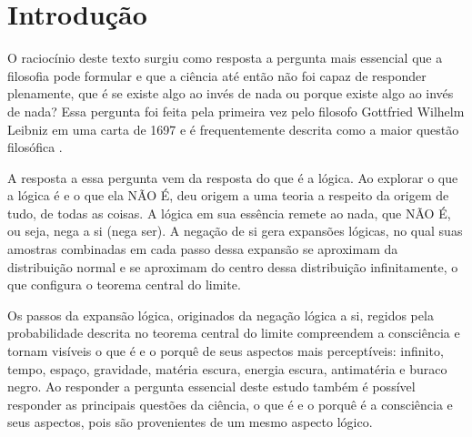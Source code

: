 \section*{Introdução}

O raciocínio deste texto surgiu como resposta a pergunta mais essencial que a filosofia pode formular e que a ciência até então não foi capaz de responder plenamente, que é se existe algo ao invés de nada ou porque existe algo ao invés de nada? 
Essa pergunta foi feita pela primeira vez pelo filosofo Gottfried Wilhelm Leibniz em uma carta de 1697 e é frequentemente descrita como a maior questão filosófica \cite{ leibnizbrasil_origem_das_coisas}.

A resposta a essa pergunta vem da resposta do que é a lógica. Ao explorar o que a lógica é e o que ela NÃO É, deu origem a uma teoria a respeito da origem de tudo, de todas as coisas. A lógica em sua essência remete ao nada, que NÃO É, ou seja, nega a si (nega ser). A negação de si gera expansões lógicas, no qual suas amostras combinadas em cada passo dessa expansão se aproximam da distribuição normal e se aproximam do centro dessa distribuição infinitamente, o que configura o teorema central do limite. 

Os passos da expansão lógica, originados da negação lógica a si, regidos pela probabilidade descrita no teorema central do limite compreendem a consciência e tornam visíveis o que é e o porquê de seus aspectos mais perceptíveis: infinito, tempo, espaço, gravidade, matéria escura, energia escura, antimatéria e buraco negro. Ao responder a pergunta essencial deste estudo também é possível responder as principais questões da ciência, o que é e o porquê é a consciência e seus aspectos, pois são provenientes de um mesmo aspecto lógico.

